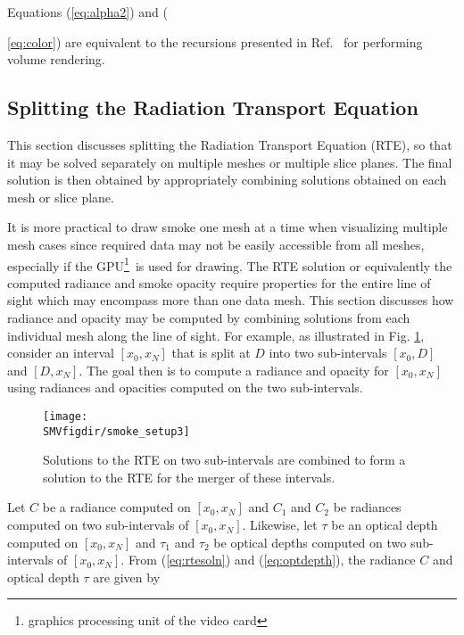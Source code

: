 Equations (\ref{eq:alpha2}) and ({\ref{eq:color}) are equivalent
to the recursions presented in Ref.~\cite[Chapter 39]{gpugems} for
performing volume rendering.


\subsection{Splitting the Radiation Transport Equation}
This section discusses splitting the Radiation Transport
Equation (RTE), so that it may be solved separately on multiple
meshes or multiple slice planes.  The final solution is then
obtained by  appropriately combining solutions obtained on each
mesh or slice plane.

It is more practical to draw smoke one mesh at a time when
visualizing multiple mesh cases since required data may not be
easily accessible from all meshes, especially if the
GPU\footnote{graphics processing unit of the video card}\ is used
for drawing.  The RTE solution or equivalently the computed
radiance and smoke opacity require  properties for the entire line
of sight which may encompass more than one data mesh.  This
section discusses how  radiance and opacity may be computed by
combining solutions from each individual mesh along the line of
sight.  For example, as illustrated in Fig. \ref{figsmokesetup3},
consider an interval $[x_0,x_N]$ that is split at $D$ into two
sub-intervals $[x_0,D]$ and $[D,x_N]$.  The goal then is to
compute a radiance and opacity for $[x_0,x_N]$ using radiances and
opacities computed on  the two sub-intervals.

\begin{figure}[bph]
\begin{center}
\texttt{[image: \\SMVfigdir/smoke\_setup3]}
\end{center}
\caption {Solutions to the RTE on two sub-intervals are combined
to form a solution to the RTE for the merger of these intervals.}
\label{figsmokesetup3}
\end{figure}

Let $C$ be a radiance computed on $[x_0,x_N]$ and $C_1$ and $C_2$
be radiances computed on two sub-intervals of $[x_0,x_N]$.
Likewise, let $\tau$ be an optical depth computed on $[x_0,x_N]$
and $\tau_1$ and $\tau_2$ be optical depths computed on two
sub-intervals of $[x_0,x_N]$. From (\ref{eq:rtesoln}) and
(\ref{eq:optdepth}), the radiance $C$ and optical depth $\tau$ are
given by

}

